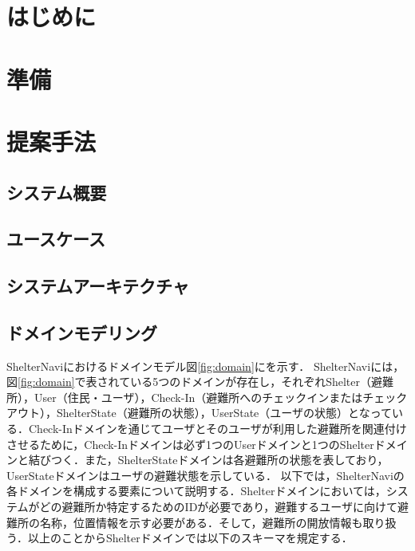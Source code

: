 \documentclass[technicalreport,dvipdfmx]{ieicej}
\begin{document}
\begin{jabstract}
\end{jabstract}
\begin{jkeyword}
\end{jkeyword}
\begin{eabstract}
\end{eabstract}
\begin{ekeyword}
\end{ekeyword}
\maketitle

\section{はじめに}

\section{準備}

\section{提案手法}
\subsection{システム概要}

\subsection{ユースケース}

\subsection{システムアーキテクチャ}

\subsection{ドメインモデリング}
ShelterNaviにおけるドメインモデル図\ref{fig:domain}にを示す．
ShelterNaviには，図\ref{fig:domain}で表されている5つのドメインが存在し，それぞれShelter（避難所），User（住民・ユーザ），Check-In（避難所へのチェックインまたはチェックアウト），ShelterState（避難所の状態），UserState（ユーザの状態）となっている．Check-Inドメインを通じてユーザとそのユーザが利用した避難所を関連付けさせるために，Check-Inドメインは必ず1つのUserドメインと1つのShelterドメインと結びつく．また，ShelterStateドメインは各避難所の状態を表しており，UserStateドメインはユーザの避難状態を示している．
以下では，ShelterNaviの各ドメインを構成する要素について説明する．Shelterドメインにおいては，システムがどの避難所か特定するためのIDが必要であり，避難するユーザに向けて避難所の名称，位置情報を示す必要がある．そして，避難所の開放情報も取り扱う．以上のことからShelterドメインでは以下のスキーマを規定する．
\end{document}
